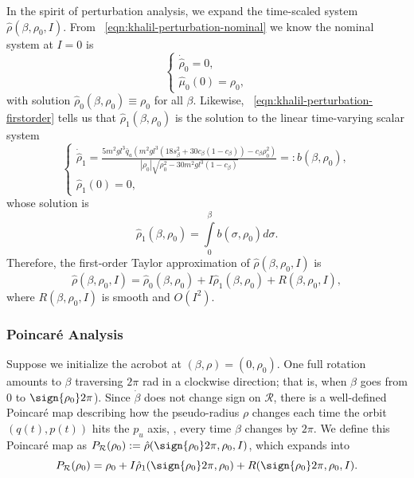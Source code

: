 In the spirit of perturbation analysis, we expand the time-scaled system 
\(\hat{\rho}(\beta,\rho_0,I)\). 
From ~\eqref{eqn:khalil-perturbation-nominal} we know the nominal system at
\(I = 0\) is
\[
    \begin{cases} 
        \dot{\hat{\rho}}_0 = 0
        , \\
        \hat{\mu}_0(0) = \rho_0
        ,
    \end{cases}
\]
with solution \(\hat{\rho}_0(\beta,\rho_0) \equiv \rho_0\) for all \(\beta\).
Likewise, ~\eqref{eqn:khalil-perturbation-firstorder} 
tells us that \(\hat{\rho}_1(\beta,\rho_0)\) is the solution to the linear
time-varying scalar system
\begin{equation}\label{eqn:acrobot-rho1-dot}
  \begin{cases}
    \dot{\hat{\rho}}_1 =
    \frac{5m^2 g l^3 \bar{q}_a \left(
        m^2gl^3\left(18s_\beta^2 + 30c_\beta(1 - c_\beta)\right)
        - c_\beta\rho_0^2
    \right)}{
    |\rho_0|\sqrt{\rho_0^2 - 30m^2gl^3(1 - c_\beta)}
    }
    =: b(\beta,\rho_0)
     , \\
     \hat{\rho}_1(0) = 0
     ,
 \end{cases}
\end{equation}
whose solution is
\[
    \hat{\rho}_1(\beta,\rho_0) = \int \limits_0^\beta b(\sigma,\rho_0)d\sigma
    .
\]
Therefore, the first-order Taylor approximation of
\(\hat{\rho}(\beta,\rho_0,I)\) is
\begin{equation}\label{eqn:acrobot-rhohat-approx}
    \hat{\rho}(\beta,\rho_0,I) = \hat{\rho}_0(\beta,\rho_0) +
    I\hat{\rho}_1(\beta,\rho_0) + R(\beta,\rho_0,I)
    ,
\end{equation}
where \(R(\beta,\rho_0,I)\) is smooth and \(O(I^2)\).

\subsubsection*{Poincar\'{e} Analysis}

Suppose we initialize the acrobot at \((\beta,\rho) = (0,\rho_0)\).
One full rotation amounts to \(\beta\) traversing \(2\pi\) rad in a clockwise
direction; that is, when \(\beta\) goes from \(0\) to \(\sign{\rho_0}2\pi\)).
Since \(\dot{\beta}\) does not change sign on \(\mathcal{R}\),
there is a well-defined Poincar\'{e} map describing how the pseudo-radius
\(\rho\) changes each time the orbit \((q(t),p(t))\) hits the \(p_u\) axis, \ie,
every time \(\beta\) changes by \(2\pi\).
We define this Poincar\'{e} map as
\(P_\mathcal{R}(\rho_0) := \hat{\rho}(\sign{\rho_0}2\pi,\rho_0,I)\),
which expands into
\[
    P_\mathcal{R}(\rho_0) = \rho_0 + I \hat{\rho}_1(\sign{\rho_0}2\pi, \rho_0)
    + R(\sign{\rho_0}2\pi,\rho_0,I)
    .
\]


